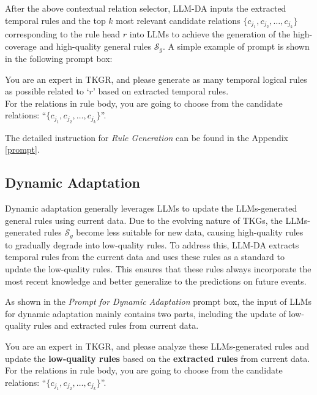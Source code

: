 \documentclass{article}
\begin{document}
After the above contextual relation selector, LLM-DA inputs the extracted temporal rules and the top $k$ most relevant candidate relations $\{c_{j_1}, c_{j_2}, \ldots, c_{j_k}\}$ corresponding to the rule head $r$ into LLMs to achieve the generation of the high-coverage and high-quality general rules $\mathcal{S}_g$. 
A simple example of prompt is shown in the following prompt box:

\begin{tcolorbox}[colback=white!5!white, colframe=black!75!black, title=Prompt for Rule Generation]
You are an expert in TKGR, and please generate as many temporal logical rules as possible related to `$r$' based on extracted temporal rules.\\
\hspace*{0.5cm} For the relations in rule body, you are going to choose from the candidate relations: ``$\{c_{j_1}, c_{j_2}, \ldots, c_{j_k}\}$''.
\end{tcolorbox}

The detailed instruction for \textit{Rule Generation} can be found in the Appendix \ref{prompt}.

\subsection{Dynamic Adaptation}
Dynamic adaptation generally leverages LLMs to update the LLMs-generated general rules using current data. Due to the evolving nature of TKGs, the LLMs-generated rules $\mathcal{S}_g$ become less suitable for new data, causing high-quality rules to gradually degrade into low-quality rules. To address this, LLM-DA extracts temporal rules from the current data and uses these rules as a standard to update the low-quality rules.
This ensures that these rules always incorporate the most recent knowledge and better generalize to the predictions on future events. 

As shown in the \textit{Prompt for Dynamic Adaptation} prompt box, the input of LLMs for dynamic adaptation mainly contains two parts, including the update of low-quality rules and extracted rules from current data. 

\begin{tcolorbox}[colback=white!5!white, colframe=black!75!black, title=Prompt for Dynamic Adaptation]
You are an expert in TKGR, and please analyze these
LLMs-generated rules and update the \textbf{low-quality rules} based on the \textbf{extracted rules} from current data.\\
\hspace*{0.5cm} For the relations in rule body, you are going to choose from the candidate relations: ``$\{c_{j_1}, c_{j_2}, \ldots, c_{j_k}\}$''.
\end{tcolorbox}
\end{document}

